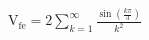 \documentclass[preview]{standalone}
\begin{document}
\begin{align*}
\mathrm{V}_{\mathrm{fe}}=2\sum_{k=1}^{\infty}\frac{\sin\!\left(\frac{k\pi}{3}\right)}{k^2}
\end{align*}
\end{document}
